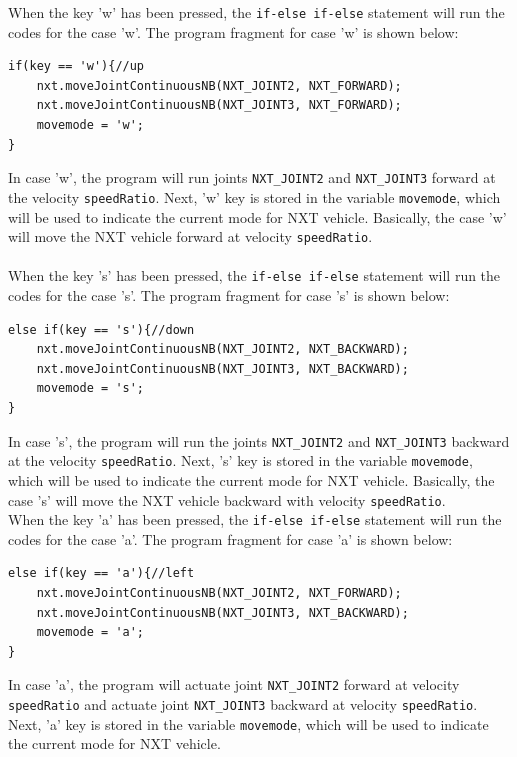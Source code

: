 \documentclass[11pt]{article}
\begin{document}
When the key 'w' has been pressed, the {\tt if-else if-else} statement will run 
the codes for the case 'w'. The program fragment for case 'w' is shown below:
\begin{lstlisting}
if(key == 'w'){//up
    nxt.moveJointContinuousNB(NXT_JOINT2, NXT_FORWARD);
    nxt.moveJointContinuousNB(NXT_JOINT3, NXT_FORWARD);
    movemode = 'w';
}
\end{lstlisting}
In case 'w', the program will run joints \verb+NXT_JOINT2+ and \verb+NXT_JOINT3+ forward at
the velocity \verb+speedRatio+. Next, 'w' key is stored in the variable \verb+movemode+, which will 
be used to indicate the current mode for NXT vehicle. Basically, the case 'w' will move the 
NXT vehicle forward at velocity \verb+speedRatio+.
\\ \\
When the key 's' has been pressed, the \verb+if-else if-else+ statement will run the codes 
for the case 's'. The program fragment for case 's' is shown below:
\begin{lstlisting}
else if(key == 's'){//down
    nxt.moveJointContinuousNB(NXT_JOINT2, NXT_BACKWARD);
    nxt.moveJointContinuousNB(NXT_JOINT3, NXT_BACKWARD);
    movemode = 's';
}
\end{lstlisting}
In case 's', the program will run the joints \verb+NXT_JOINT2+ and \verb+NXT_JOINT3+ backward 
at the velocity \verb+speedRatio+. Next, 's' key is stored in the variable \verb+movemode+, 
which will be used to indicate the current mode for NXT vehicle. Basically, the case 's' will 
move the NXT vehicle backward with velocity \verb+speedRatio+.\\ 
\newline
When the key 'a' has been pressed, the \verb+if-else if-else+ statement will run the codes for the case 'a'.
The program fragment for case 'a' is shown below:
\begin{lstlisting}
else if(key == 'a'){//left
    nxt.moveJointContinuousNB(NXT_JOINT2, NXT_FORWARD);
    nxt.moveJointContinuousNB(NXT_JOINT3, NXT_BACKWARD);
    movemode = 'a';
}
\end{lstlisting}
In case 'a', the program will actuate joint \verb+NXT_JOINT2+ forward at velocity \verb+speedRatio+ 
and actuate joint \verb+NXT_JOINT3+ backward at velocity \verb+speedRatio+. Next, 'a' key is stored in 
the variable \verb+movemode+, which will be used to indicate the current mode for NXT vehicle.\\ 
\newline
\end{document}

